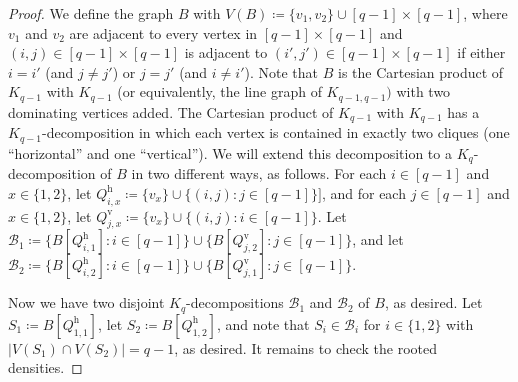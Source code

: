 \documentclass[11pt]{article}
\numberwithin{equation}{section}
\newcounter{i}
\theoremstyle{plain}
\theoremstyle{plain} %
\theoremstyle{definition}
\newcommand{\cB}{\mathcal{B}}
\newcommand\hoclique{\ensuremath{\text{h}}}
\newcommand\vertclique{\ensuremath{{\text{v}}}}
\begin{document}
\begin{proof}
    We define the graph $B$ with $V(B) \coloneqq \{v_1, v_2\} \cup [q-1]\times[q-1]$, where $v_1$ and $v_2$ are adjacent to every vertex in $[q - 1] \times [q - 1]$ and $(i,j) \in [q - 1]\times[q - 1]$ is adjacent to $(i',j') \in [q - 1]\times[q - 1]$ if either $i = i'$ (and $j \neq j'$) or $j = j'$ (and $i \neq i'$).
    Note that $B$ is the Cartesian product of $K_{q - 1}$ with $K_{q - 1}$ (or equivalently, the line graph of $K_{q-1,q-1})$ with two dominating vertices added.  The Cartesian product of $K_{q-1}$ with $K_{q - 1}$ has a $K_{q - 1}$-decomposition in which each vertex is contained in exactly two cliques (one ``horizontal'' and one ``vertical'').  We will extend this decomposition to a $K_q$-decomposition of $B$ in two different ways, as follows.  
    For each $i \in [q - 1]$ and $x \in \{1,2\}$, let $Q^{\hoclique}_{i,x} \coloneqq \{v_x\} \cup \{(i, j) : j \in [q - 1]\}]$, and for each $j \in [q - 1]$ and $x \in \{1,2\}$, let $Q^{\vertclique}_{j,x} \coloneqq \{v_x\} \cup \{(i,j) : i \in [q-1]\}$.  Let $\cB_1 \coloneqq \{B[Q^{\hoclique}_{i,1}] : i \in [q - 1]\} \cup \{B[Q^{\vertclique}_{j,2}] : j \in [q - 1]\}$, and let $\cB_2 \coloneqq \{B[Q^{\hoclique}_{i,2}] : i \in [q - 1]\} \cup \{B[Q^{\vertclique}_{j,1}] : j \in [q - 1]\}$.

    Now we have two disjoint $K_q$-decompositions $\cB_1$ and $\cB_2$ of $B$, as desired.  Let  
    $S_1 \coloneqq B[Q^{\hoclique}_{1,1}]$, let $S_2 \coloneqq B[Q^{\hoclique}_{1,2}]$, and note that $S_i \in \cB_i$ for $i \in \{1,2\}$ with $|V(S_1) \cap V(S_2)| = q - 1$, as desired.  It remains to check the rooted densities.  


\end{proof}
\end{document}
